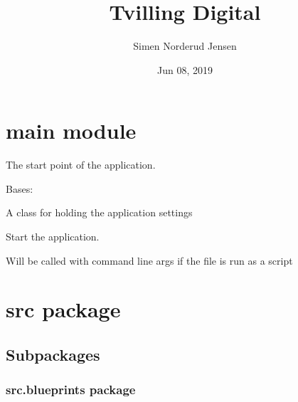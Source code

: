 \documentclass[letterpaper,10pt,english]{sphinxmanual}
\title{Tvilling Digital}
\date{Jun 08, 2019}
\author{Simen Norderud Jensen}
\begin{document}
\pagestyle{empty}
\sphinxmaketitle
\pagestyle{plain}
\sphinxtableofcontents
\pagestyle{normal}
\label{\detokenize{index::doc}}



\chapter{main module}
\label{\detokenize{main:module-main}}\label{\detokenize{main:main-module}}\label{\detokenize{main::doc}}
The start point of the application.

\begin{fulllineitems}
\label{\detokenize{main:main.Settings}}
Bases: 

A class for holding the application settings

\end{fulllineitems}


\begin{fulllineitems}
\label{\detokenize{main:main.main}}
Start the application.

Will be called with command line args if the file is run as a script

\end{fulllineitems}



\chapter{src package}
\label{\detokenize{src:src-package}}\label{\detokenize{src::doc}}

\section{Subpackages}
\label{\detokenize{src:subpackages}}

\subsection{src.blueprints package}
\label{\detokenize{src.blueprints:src-blueprints-package}}\label{\detokenize{src.blueprints::doc}}
\end{document}
